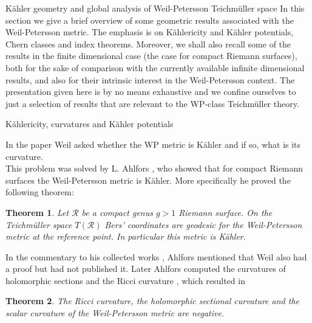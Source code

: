 \documentclass[12pt]{amsart}
\theoremstyle{plain}
\newtheorem{theorem}{Theorem}[section]
\theoremstyle{definition}
\theoremstyle{remark}
\numberwithin{equation}{section} %
\numberwithin{figure}{section} %
\begin{document}
\begin{section}{K\"ahler geometry and global analysis of Weil-Petersson Teichm\"uller space} \label{se:Kahler_and_global}
 In this section we give a brief overview of
 some geometric results associated with the Weil-Petersson metric. The emphasis is on Kählericity and Kähler potentials, Chern classes and index theorems. Moreover, we shall also recall some of the results in the finite dimensional case (the case for compact Riemann surfaces), both for the sake of comparison with the currently available infinite dimensional results, and also for their intrinsic interest in the Weil-Petersson context. The presentation given here is by no means exhaustive and we confine ourselves to just a selection of results that are relevant to the WP-class Teichm\"uller theory. 
 
\begin{subsection}{K\"ahlericity, curvatures and K\"ahler potentials}

In the paper \cite{Weil2} Weil asked whether the WP metric is K\"ahler and if so, what is its curvature.\\
This problem was solved by L. Ahlfors \cite{Ahlfors_Kahler} , who showed that for compact Riemann
 surfaces the Weil-Petersson metric is K\"ahler. 
 More specifically he proved the following theorem:
 \begin{theorem}
Let $\mathscr{R}$ be a compact genus $g>1$ Riemann surface. On the Teichmüller space \(T(\mathscr{R})\) Bers' coordinates are geodesic
for the Weil-Petersson metric at the reference point. In particular this metric
is Kähler.     
 \end{theorem}
 
 In the
 commentary to his collected works \cite{Ahlfors collected}, Ahlfors mentioned that Weil also had a proof but had not published it.  Later Ahlfors computed the curvatures of holomorphic sections and the
 Ricci curvature \cite{Ahlfors_curvature}, which resulted in

 \begin{theorem}
The Ricci curvature, the holomorphic sectional curvature and the
scalar curvature of the Weil-Petersson metric are negative.
 \end{theorem}


\end{subsection}
\end{section}
\end{document}
